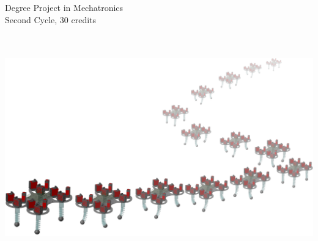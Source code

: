 \begin{titlepage}
    \begin{flushleft}
        \fontsize{14}{13}\upshape Degree Project in Mechatronics \\
        \vspace{8pt}
        \upshape Second Cycle, 30 credits ~\\
        \vspace{40pt}
        {\fontsize{25}{20}\bf\sffamily\@title\\}
        \vspace{30pt}
        {\fontsize{20}{18}\sffamily \@author\\}
    \end{flushleft}
    
    \vspace*{1em}
    \hspace*{-0.2\textwidth}
    \begin{center}
        \includegraphics[width=0.8\paperwidth]{setup/img/robot_walk.pdf}
    \end{center}
    

\end{titlepage}
